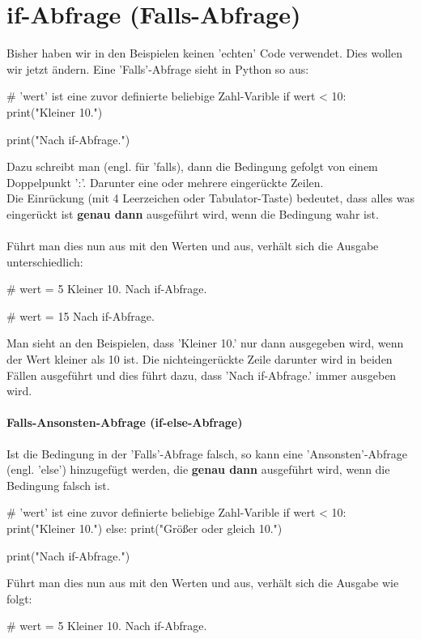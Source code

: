 \documentclass{\VorlagenPfad/coderdojokatext}
\begin{document}
\clearpage

\section{if-Abfrage (Falls-Abfrage)} Bisher haben wir in den Beispielen keinen 'echten' Code verwendet. Dies wollen wir jetzt ändern.
Eine 'Falls'-Abfrage sieht in Python so aus:

\begin{pythoncode}
# 'wert' ist eine zuvor definierte beliebige Zahl-Varible
if wert < 10:
	print("Kleiner 10.")
	
print("Nach if-Abfrage.")
\end{pythoncode}

Dazu schreibt man  (engl. für 'falls), dann die Bedingung gefolgt von einem Doppelpunkt ':'. Darunter eine oder mehrere eingerückte Zeilen.
\\
Die Einrückung (mit 4 Leerzeichen oder Tabulator-Taste) bedeutet, dass alles was eingerückt ist \textbf{genau dann} ausgeführt wird, wenn die Bedingung wahr ist.
\\
\\
Führt man dies nun aus mit den Werten  und  aus, verhält sich die Ausgabe unterschiedlich:
\begin{pythoncode}
# wert = 5
Kleiner 10.
Nach if-Abfrage.
\end{pythoncode}


\begin{pythoncode}
# wert = 15
Nach if-Abfrage.
\end{pythoncode}

Man sieht an den Beispielen, dass 'Kleiner 10.' nur dann ausgegeben wird, wenn der Wert kleiner als 10 ist. Die nichteingerückte Zeile darunter wird in beiden Fällen ausgeführt und dies führt dazu, dass 'Nach if-Abfrage.' immer ausgeben wird.


\paragraph{Falls-Ansonsten-Abfrage (if-else-Abfrage)} Ist die Bedingung in der 'Falls'-Abfrage falsch, so kann eine 'Ansonsten'-Abfrage (engl. 'else') hinzugefügt werden, die \textbf{genau dann} ausgeführt wird, wenn die Bedingung falsch ist.

\begin{pythoncode}
# 'wert' ist eine zuvor definierte beliebige Zahl-Varible
if wert < 10:
	print("Kleiner 10.")
else:
	print("Größer oder gleich 10.")

print("Nach if-Abfrage.")
\end{pythoncode}
Führt man dies nun aus mit den Werten  und  aus, verhält sich die Ausgabe wie folgt:
\begin{pseudocode}
# wert = 5
Kleiner 10.
Nach if-Abfrage.
\end{pseudocode}
\end{document}
